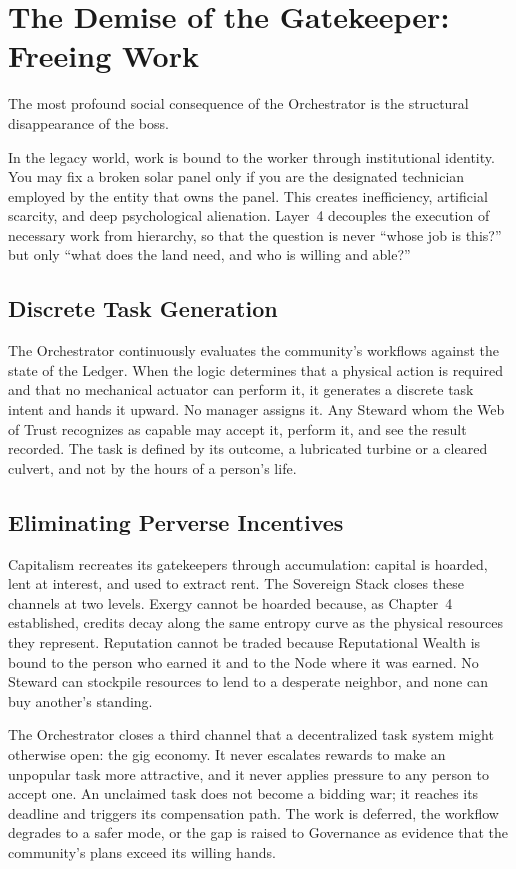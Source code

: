 \section{The Demise of the Gatekeeper: Freeing Work}

The most profound social consequence of the Orchestrator is the structural disappearance of the boss.

In the legacy world, work is bound to the worker through institutional identity. You may fix a broken solar panel only if you are the designated technician employed by the entity that owns the panel. This creates inefficiency, artificial scarcity, and deep psychological alienation. Layer~4 decouples the execution of necessary work from hierarchy, so that the question is never ``whose job is this?'' but only ``what does the land need, and who is willing and able?''

\subsection{Discrete Task Generation}

The Orchestrator continuously evaluates the community's workflows against the state of the Ledger. When the logic determines that a physical action is required and that no mechanical actuator can perform it, it generates a discrete task intent and hands it upward. No manager assigns it. Any Steward whom the Web of Trust recognizes as capable may accept it, perform it, and see the result recorded. The task is defined by its outcome, a lubricated turbine or a cleared culvert, and not by the hours of a person's life.

\subsection{Eliminating Perverse Incentives}

Capitalism recreates its gatekeepers through accumulation: capital is hoarded, lent at interest, and used to extract rent. The Sovereign Stack closes these channels at two levels. Exergy cannot be hoarded because, as Chapter~4 established, credits decay along the same entropy curve as the physical resources they represent. Reputation cannot be traded because Reputational Wealth is bound to the person who earned it and to the Node where it was earned. No Steward can stockpile resources to lend to a desperate neighbor, and none can buy another's standing.

The Orchestrator closes a third channel that a decentralized task system might otherwise open: the gig economy. It never escalates rewards to make an unpopular task more attractive, and it never applies pressure to any person to accept one. An unclaimed task does not become a bidding war; it reaches its deadline and triggers its compensation path. The work is deferred, the workflow degrades to a safer mode, or the gap is raised to Governance as evidence that the community's plans exceed its willing hands.

